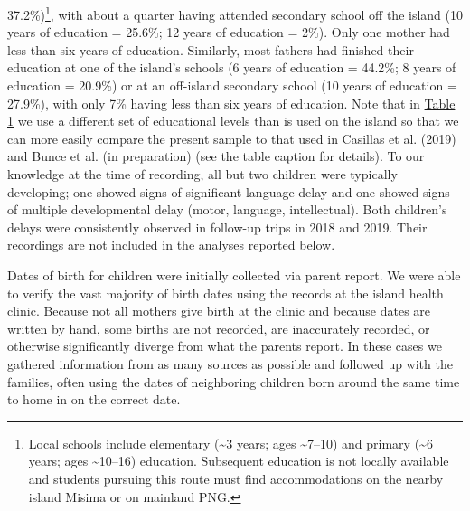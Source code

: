 \documentclass[,man,mask,floatsintext]{apa6}
\let\rmarkdownfootnote\footnote%
\def\footnote{\protect\rmarkdownfootnote}
\begin{document}
37.2\%)\footnote{Local schools include elementary (\textasciitilde{}3
  years; ages \textasciitilde{}7--10) and primary (\textasciitilde{}6
  years; ages \textasciitilde{}10--16) education. Subsequent education
  is not locally available and students pursuing this route must find
  accommodations on the nearby island Misima or on mainland PNG.}, with
about a quarter having attended secondary school off the island (10
years of education = 25.6\%; 12 years of education = 2\%). Only one
mother had less than six years of education. Similarly, most fathers had
finished their education at one of the island's schools (6 years of
education = 44.2\%; 8 years of education = 20.9\%) or at an off-island
secondary school (10 years of education = 27.9\%), with only 7\% having
less than six years of education. Note that in
\protect\hyperlink{tab1}{Table 1} we use a different set of educational
levels than is used on the island so that we can more easily compare the
present sample to that used in Casillas et al. (2019) and Bunce et al.
(in preparation) (see the table caption for details). To our knowledge
at the time of recording, all but two children were typically
developing; one showed signs of significant language delay and one
showed signs of multiple developmental delay (motor, language,
intellectual). Both children's delays were consistently observed in
follow-up trips in 2018 and 2019. Their recordings are not included in
the analyses reported below.

Dates of birth for children were initially collected via parent report.
We were able to verify the vast majority of birth dates using the
records at the island health clinic. Because not all mothers give birth
at the clinic and because dates are written by hand, some births are not
recorded, are inaccurately recorded, or otherwise significantly diverge
from what the parents report. In these cases we gathered information
from as many sources as possible and followed up with the families,
often using the dates of neighboring children born around the same time
to home in on the correct date.
\end{document}
